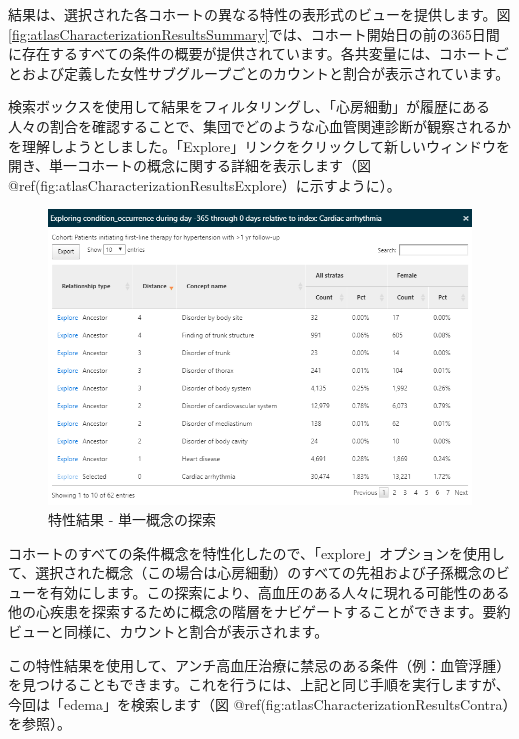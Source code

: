 \documentclass[
  11pt]{book}
\theoremstyle{definition}
\theoremstyle{definition}
\theoremstyle{definition}
\theoremstyle{definition}
\theoremstyle{remark}
\begin{document}
結果は、選択された各コホートの異なる特性の表形式のビューを提供します。図 \ref{fig:atlasCharacterizationResultsSummary}では、コホート開始日の前の365日間に存在するすべての条件の概要が提供されています。各共変量には、コホートごとおよび定義した女性サブグループごとのカウントと割合が表示されています。

検索ボックスを使用して結果をフィルタリングし、「心房細動」が履歴にある人々の割合を確認することで、集団でどのような心血管関連診断が観察されるかを理解しようとしました。「Explore」リンクをクリックして新しいウィンドウを開き、単一コホートの概念に関する詳細を表示します（図 @ref(fig:atlasCharacterizationResultsExplore）に示すように）。

\begin{figure}

{\centering \includegraphics[width=1\linewidth]{images/Characterization/atlasCharacterizationResultsExplore} 

}

\caption{特性結果 - 単一概念の探索}\label{fig:atlasCharacterizationResultsExplore}
\end{figure}

コホートのすべての条件概念を特性化したので、「explore」オプションを使用して、選択された概念（この場合は心房細動）のすべての先祖および子孫概念のビューを有効にします。この探索により、高血圧のある人々に現れる可能性のある他の心疾患を探索するために概念の階層をナビゲートすることができます。要約ビューと同様に、カウントと割合が表示されます。

この特性結果を使用して、アンチ高血圧治療に禁忌のある条件（例：血管浮腫）を見つけることもできます。これを行うには、上記と同じ手順を実行しますが、今回は「edema」を検索します（図 @ref(fig:atlasCharacterizationResultsContra）を参照）。
\end{document}
